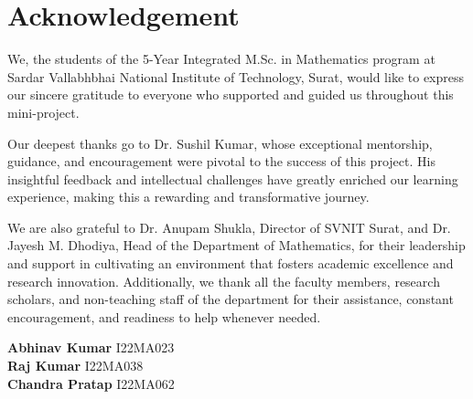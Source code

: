\chapter*{Acknowledgement}%

	
We, the students of the 5-Year Integrated M.Sc. in Mathematics program at Sardar Vallabhbhai National Institute of Technology, Surat, would like to express our sincere gratitude to everyone who supported and guided us throughout this mini-project.\\

\vspace{0.2cm}

Our deepest thanks go to Dr. Sushil Kumar, whose exceptional mentorship, guidance, and encouragement were pivotal to the success of this project. His insightful feedback and intellectual challenges have greatly enriched our learning experience, making this a rewarding and transformative journey. \\

\vspace{0.2cm}

We are also grateful to Dr. Anupam Shukla, Director of SVNIT Surat, and Dr. Jayesh M. Dhodiya, Head of the Department of Mathematics, for their leadership and support in cultivating an environment that fosters academic excellence and research innovation. Additionally, we thank all the faculty members, research scholars, and non-teaching staff of the department for their assistance, constant encouragement, and readiness to help whenever needed.

\vspace{0.8cm}
\raggedright
\textbf{Abhinav Kumar} \hspace{0.36cm} I22MA023 \\ [0.3cm]
\textbf{Raj Kumar} \hspace{1.2cm} I22MA038 \\ [0.3cm]
\textbf{Chandra Pratap} \hspace{0.35cm} I22MA062

